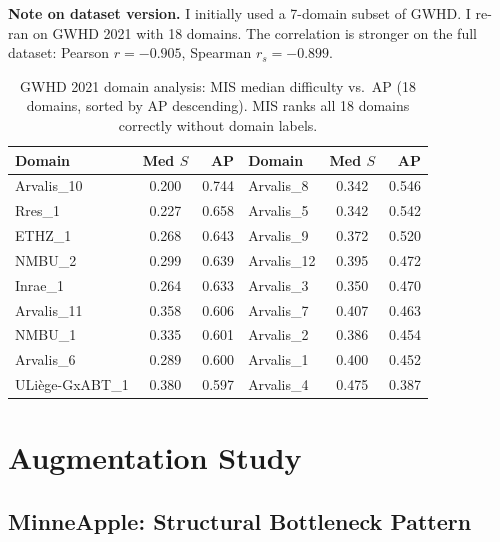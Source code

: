 \documentclass[10pt, a4paper]{article}
\begin{document}
\textbf{Note on dataset version.}
I initially used a 7-domain subset of GWHD.
I re-ran on GWHD 2021 with 18 domains.
The correlation is stronger on the full dataset: Pearson $r=-0.905$,
Spearman $r_s=-0.899$.

\begin{table}[H]
\centering\small
\caption{GWHD 2021 domain analysis: MIS median difficulty vs.\ AP
  (18 domains, sorted by AP descending).
  MIS ranks all 18 domains correctly without domain labels.}
\begin{tabular}{lcr||lcr}
\toprule
\textbf{Domain} & \textbf{Med $S$} & \textbf{AP}
  & \textbf{Domain} & \textbf{Med $S$} & \textbf{AP} \\
\midrule
Arvalis\_10     & 0.200 & 0.744 & Arvalis\_8      & 0.342 & 0.546 \\
Rres\_1         & 0.227 & 0.658 & Arvalis\_5      & 0.342 & 0.542 \\
ETHZ\_1         & 0.268 & 0.643 & Arvalis\_9      & 0.372 & 0.520 \\
NMBU\_2         & 0.299 & 0.639 & Arvalis\_12     & 0.395 & 0.472 \\
Inrae\_1        & 0.264 & 0.633 & Arvalis\_3      & 0.350 & 0.470 \\
Arvalis\_11     & 0.358 & 0.606 & Arvalis\_7      & 0.407 & 0.463 \\
NMBU\_1         & 0.335 & 0.601 & Arvalis\_2      & 0.386 & 0.454 \\
Arvalis\_6      & 0.289 & 0.600 & Arvalis\_1      & 0.400 & 0.452 \\
ULiège-GxABT\_1 & 0.380 & 0.597 & Arvalis\_4      & 0.475 & 0.387 \\
\bottomrule
\end{tabular}
\end{table}

\section{Augmentation Study}

\subsection{MinneApple: Structural Bottleneck Pattern}
\end{document}
